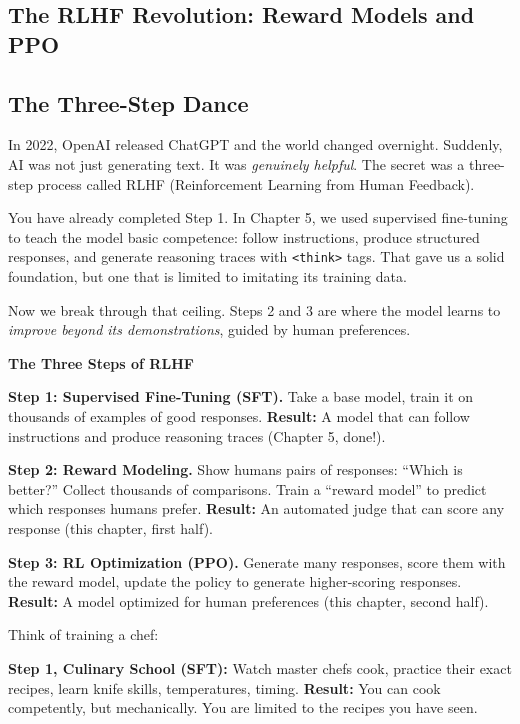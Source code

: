 \begin{chapterenv}

\chapter{The RLHF Revolution: Reward Models and PPO}

\section{The Three-Step Dance}

In 2022, OpenAI released ChatGPT and the world changed overnight. Suddenly, AI was not just generating text. It was \textit{genuinely helpful}. The secret was a three-step process called RLHF (Reinforcement Learning from Human Feedback).

You have already completed Step 1. In Chapter 5, we used supervised fine-tuning to teach the model basic competence: follow instructions, produce structured responses, and generate reasoning traces with \texttt{<think>} tags. That gave us a solid foundation, but one that is limited to imitating its training data.

Now we break through that ceiling. Steps 2 and 3 are where the model learns to \textit{improve beyond its demonstrations}, guided by human preferences.

\begin{infobox}
\textbf{The Three Steps of RLHF}

\textbf{Step 1: Supervised Fine-Tuning (SFT).} Take a base model, train it on thousands of examples of good responses. \textbf{Result:} A model that can follow instructions and produce reasoning traces (Chapter 5, done!).

\textbf{Step 2: Reward Modeling.} Show humans pairs of responses: ``Which is better?'' Collect thousands of comparisons. Train a ``reward model'' to predict which responses humans prefer. \textbf{Result:} An automated judge that can score any response (this chapter, first half).

\textbf{Step 3: RL Optimization (PPO).} Generate many responses, score them with the reward model, update the policy to generate higher-scoring responses. \textbf{Result:} A model optimized for human preferences (this chapter, second half).
\end{infobox}

\begin{infobox}
Think of training a chef:

\textbf{Step 1, Culinary School (SFT):} Watch master chefs cook, practice their exact recipes, learn knife skills, temperatures, timing. \textbf{Result:} You can cook competently, but mechanically. You are limited to the recipes you have seen.


\end{infobox}
\end{chapterenv}
